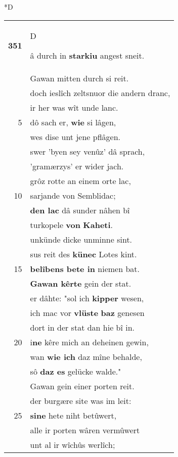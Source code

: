 \documentclass[8pt,a4paper,notitlepage]{article}
\begin{document}
\begin{table}[ht]
\begin{minipage}[t]{0.5\linewidth}
\small
\begin{center}*D
\end{center}
\begin{tabular}{rl}
\textbf{351} & \begin{large}D\end{large}â durch in \textbf{starkiu} angest sneit.\\ 
 & Gawan mitten durch si reit.\\ 
 & doch ieslîch zeltsnuor die andern dranc,\\ 
 & ir her was wît unde lanc.\\ 
5 & dô sach er, \textbf{wie} si lâgen,\\ 
 & wes dise unt jene pflâgen.\\ 
 & swer 'byen sey venûz' dâ sprach,\\ 
 & 'gramærzys' er wider jach.\\ 
 & grôz rotte an einem orte lac,\\ 
10 & sarjande von Semblidac;\\ 
 & \textbf{den lac} dâ sunder nâhen bî\\ 
 & turkopele \textbf{von} \textbf{Kaheti}.\\ 
 & unkünde dicke unminne sint.\\ 
 & sus reit des \textbf{künec} Lotes kint.\\ 
15 & \textbf{belîbens bete in} niemen bat.\\ 
 & \textbf{Gawan kêrte} gein der stat.\\ 
 & er dâhte: "sol ich \textbf{kipper} wesen,\\ 
 & ich mac vor \textbf{vlüste} \textbf{baz} genesen\\ 
 & dort in der stat dan hie bî in.\\ 
20 & i\textbf{ne} kêre mich an deheinen gewin,\\ 
 & wan \textbf{wie ich} daz mîne behalde,\\ 
 & sô \textbf{daz es} gelücke walde."\\ 
 & Gawan gein einer porten reit.\\ 
 & der burgære site was im leit:\\ 
25 & \textbf{si}\textbf{ne} hete niht betûwert,\\ 
 & alle ir porten wâren vermûwert\\ 
 & unt al ir wîchûs werlîch;\\ 

\end{tabular}
\end{minipage}
\end{table}
\end{document}
